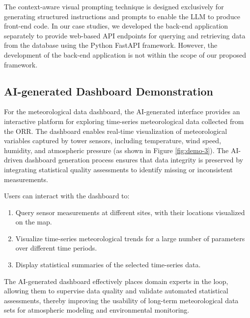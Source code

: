 The context-aware visual prompting technique is designed exclusively for generating structured instructions and prompts to enable the LLM to produce front-end code. In our case studies, we developed the back-end application separately to provide web-based API endpoints for querying and retrieving data from the database using the Python FastAPI framework. However, the development of the back-end application is not within the scope of our proposed framework.

\subsection{AI-generated Dashboard Demonstration}
For the meteorological data dashboard, the AI-generated interface provides an interactive platform for exploring time-series meteorological data collected from the ORR. The dashboard enables real-time visualization of meteorological variables captured by tower sensors, including temperature, wind speed, humidity, and atmospheric pressure (as shown in Figure \ref{fig:demo-3}). The AI-driven dashboard generation process ensures that data integrity is preserved by integrating statistical quality assessments to identify missing or inconsistent measurements.

Users can interact with the dashboard to:
\begin{enumerate}
\item Query sensor measurements at different sites, with their locations visualized on the map.
\item Visualize time-series meteorological trends for a large number of parameters over different time periods.
\item Display statistical summaries of the selected time-series data.
\end{enumerate}
The AI-generated dashboard effectively places domain experts in the loop, allowing them to supervise data quality and validate automated statistical assessments, thereby improving the usability of long-term meteorological data sets for atmospheric modeling and environmental monitoring.


